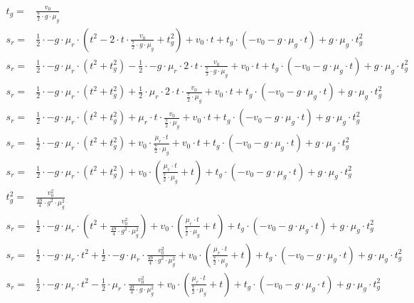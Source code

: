 \begin{equation}
\begin{aligned}
t_g = & \frac{v_0}{\frac{7}{2} \cdot g \cdot \mu_g}\\
s_r = & \frac{1}{2} \cdot -g \cdot \mu_r \cdot (t^2 - 2 \cdot t \cdot \frac{v_0}{\frac{7}{2} \cdot g \cdot \mu_g} + t_g^2) + v_0 \cdot t + t_g \cdot (-v_0 - g \cdot \mu_g \cdot t) + g \cdot \mu_g \cdot t_g^2\\
s_r = & \frac{1}{2} \cdot -g \cdot \mu_r \cdot (t^2 + t_g^2) - \frac{1}{2} \cdot -g \cdot \mu_r \cdot 2 \cdot t \cdot \frac{v_0}{\frac{7}{2} \cdot g \cdot \mu_g} + v_0 \cdot t + t_g \cdot (-v_0 - g \cdot \mu_g \cdot t) + g \cdot \mu_g \cdot t_g^2\\
s_r = & \frac{1}{2} \cdot -g \cdot \mu_r \cdot (t^2 + t_g^2) + \frac{1}{2} \cdot \mu_r \cdot 2 \cdot t \cdot \frac{v_0}{\frac{7}{2} \cdot \mu_g} + v_0 \cdot t + t_g \cdot (-v_0 - g \cdot \mu_g \cdot t) + g \cdot \mu_g \cdot t_g^2\\
s_r = & \frac{1}{2} \cdot -g \cdot \mu_r \cdot (t^2 + t_g^2) + \mu_r \cdot t \cdot \frac{v_0}{\frac{7}{2} \cdot \mu_g} + v_0 \cdot t + t_g \cdot (-v_0 - g \cdot \mu_g \cdot t) + g \cdot \mu_g \cdot t_g^2\\
s_r = & \frac{1}{2} \cdot -g \cdot \mu_r \cdot (t^2 + t_g^2) + v_0 \cdot \frac{\mu_r \cdot t}{\frac{7}{2} \cdot \mu_g} + v_0 \cdot t + t_g \cdot (-v_0 - g \cdot \mu_g \cdot t) + g \cdot \mu_g \cdot t_g^2\\
s_r = & \frac{1}{2} \cdot -g \cdot \mu_r \cdot (t^2 + t_g^2) + v_0 \cdot (\frac{\mu_r \cdot t}{\frac{7}{2} \cdot \mu_g} + t) + t_g \cdot (-v_0 - g \cdot \mu_g \cdot t) + g \cdot \mu_g \cdot t_g^2\\
t_g^2 = & \frac{v_0^2}{\frac{49}{4} \cdot g^2 \cdot \mu_g^2}\\
s_r = & \frac{1}{2} \cdot -g \cdot \mu_r \cdot (t^2 + \frac{v_0^2}{\frac{49}{4} \cdot g^2 \cdot \mu_g^2}) + v_0 \cdot (\frac{\mu_r \cdot t}{\frac{7}{2} \cdot \mu_g} + t) + t_g \cdot (-v_0 - g \cdot \mu_g \cdot t) + g \cdot \mu_g \cdot t_g^2\\
s_r = & \frac{1}{2} \cdot -g \cdot \mu_r \cdot t^2 + \frac{1}{2} \cdot -g \cdot \mu_r \cdot \frac{v_0^2}{\frac{49}{4} \cdot g^2 \cdot \mu_g^2} + v_0 \cdot (\frac{\mu_r \cdot t}{\frac{7}{2} \cdot \mu_g} + t) + t_g \cdot (-v_0 - g \cdot \mu_g \cdot t) + g \cdot \mu_g \cdot t_g^2\\
s_r = & \frac{1}{2} \cdot -g \cdot \mu_r \cdot t^2 - \frac{1}{2} \cdot \mu_r \cdot \frac{v_0^2}{\frac{49}{4} \cdot g \cdot \mu_g^2} + v_0 \cdot (\frac{\mu_r \cdot t}{\frac{7}{2} \cdot \mu_g} + t) + t_g \cdot (-v_0 - g \cdot \mu_g \cdot t) + g \cdot \mu_g \cdot t_g^2\\

\end{aligned}
\end{equation}

